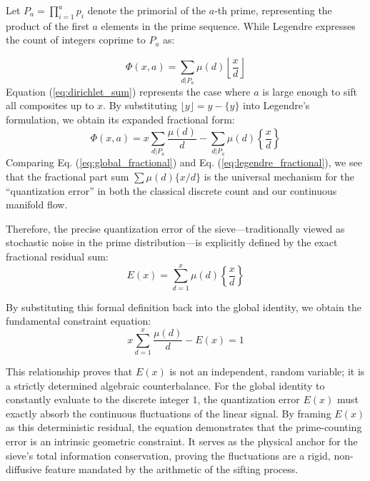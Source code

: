 \documentclass[sn-mathphys-num, pdflatex]{sn-jnl}
\begin{document}
Let $P_a = \prod_{i=1}^a p_i$ denote the primorial of the $a$-th prime, representing the product of the first $a$ elements in the prime sequence. While Legendre expresses the count of integers coprime to $P_a$ as:

\begin{equation}
\Phi(x, a) = \sum_{d|P_a} \mu(d) \left\lfloor \frac{x}{d} \right\rfloor
\end{equation}
Equation (\ref{eq:dirichlet_sum}) represents the case where $a$ is large enough to sift all composites up to $x$. By substituting $\lfloor y \rfloor = y - \{y\}$ into Legendre's formulation, we obtain its expanded fractional form:
\begin{equation}
\Phi(x, a) = x \sum_{d|P_a} \frac{\mu(d)}{d} - \sum_{d|P_a} \mu(d) \left\{ \frac{x}{d} \right\}
\label{eq:legendre_fractional}
\end{equation}
Comparing Eq. (\ref{eq:global_fractional}) and Eq. (\ref{eq:legendre_fractional}), we see that the fractional part sum $\sum \mu(d) \{x/d\}$ is the universal mechanism for the ``quantization error'' in both the classical discrete count and our continuous manifold flow.

Therefore, the precise quantization error of the sieve---traditionally viewed as stochastic noise in the prime distribution---is explicitly defined by the exact fractional residual sum:
\begin{equation}
E(x) = \sum_{d=1}^{x} \mu(d) \left\{ \frac{x}{d} \right\}
\end{equation}

By substituting this formal definition back into the global identity, we obtain the fundamental constraint equation:
\begin{equation}
x \sum_{d=1}^{x} \frac{\mu(d)}{d} - E(x) = 1
\end{equation}

This relationship proves that $E(x)$ is not an independent, random variable; it is a strictly determined algebraic counterbalance. For the global identity to constantly evaluate to the discrete integer $1$, the quantization error $E(x)$ must exactly absorb the continuous fluctuations of the linear signal. By framing $E(x)$ as this deterministic residual, the equation demonstrates that the prime-counting error is an intrinsic geometric constraint. It serves as the physical anchor for the sieve's total information conservation, proving the fluctuations are a rigid, non-diffusive feature mandated by the arithmetic of the sifting process.
\end{document}
